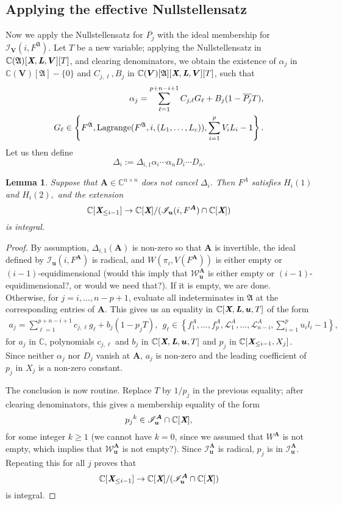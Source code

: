 \documentclass[a4paper]{article}
\def\A{\mathfrak{A}}
\def\Lb{\textit{\textbf{L}}}
\def\Xb{\textit{\textbf{X}}}
\def\mA{{\bm A}}
\def\ub{{\bm u}}
\def\pjb{\overline{P_{j}}}
\def\D{\Delta}
\DeclareMathOperator{\lag}{Lagrange}
\def\C{\mathbb{C}}
\def\WiA{W(\pi_i,V(F^{\mA}))}
\def\lagFfA{{\bm\lag}(F^{\A},i,(L_1,\hdots,L_c))}
\def\Il{\mathscr{I}_{\ub}}
\def\IilA{\mathscr{I}_{\ub}(i,F^{\mA})}
\def\IilfAV{\mathscr{I}_{\bm V}(i,F^{\A})}
\def\Wl{\mathscr{W}_{\ub}}
\def\udl{\sum_{i=1}^pu_il_i}
\def\Vdl{\sum_{i=1}^pV_iL_i}
\newtheorem{lemma}[theorem]{Lemma}
\begin{document}
\subsection{Applying the effective Nullstellensatz}
Now we apply the Nullstellensatz for $\pjb$ with the ideal membership for $\IilfAV.$ Let $T$ be a new variable; applying the
Nullstellensatz in $\C(\A)[\Xb,\Lb,\bm V][T]$, and clearing
denominators, we obtain the existence of $\alpha_j$ in
$\C(\bm V)[\A]-\{0\}$ and $ C_{j,\ell},B_j$ in
$\C(\bm V)[\A][\Xb,\Lb,\bm V][T]$, such that
\begin{align*}
\alpha_j = \sum_{\ell=1}^{p+n-i+1} C_{j,\ell} G_\ell + B_j (1-\pjb T),\\  G_\ell \in 
\left\{ 
F^\A,\lagFfA, \Vdl-1
\right\}.
\end{align*}
Let us then define 
$$\D_{i}:=\D_{i,1} \alpha_i \cdots \alpha_n D_i \cdots D_n.$$

\begin{lemma}\label{lem:6.4}
Suppose that $\mA \in \C^{n\times n}$ does not cancel $\D_{i}$. Then $F^A$ satisfies $H_i(1)$ and $H_i(2),$ and the extension
\[
 \C[\Xb_{\leq i-1}]\rightarrow \C[\Xb]/(\IilA \cap \C[\Xb])
\]
is integral.
\end{lemma}

\begin{proof}
By assumption, $\D_{i,1}(\mA)$ is non-zero so that $\mA$ is
invertible, the
ideal defined by $\IilA$ is radical, and 
$\WiA$ is either empty or $(i-1)$-equidimensional (would this imply that $\Wl^{\mA}$ is either empty or $(i-1)$-equidimensional?, or would we need that?). If
it is empty, we are done. Otherwise, for $j=i,\dots,n-p+1$, evaluate all indeterminates in $\A$ at the
corresponding entries of $\mA$. This gives us
an equality in $\C[\Xb,\Lb,\ub,T]$ of the form
\begin{align*}
a_j = \sum_{\ell=1}^{p+n-i+1} c_{j,\ell} g_\ell + b_j (1-p_j T),\ \  g_\ell \in 
\left\{ 
f_1^A,\hdots,f_p^A,\mathscr{L}_1^A,\dots,\mathscr{L}_{n-i}^A, \udl-1
\right\},
\end{align*}
for $a_j$ in $\C$, polynomials $c_{j,\ell}$ and $b_j$ in
$\C[\Xb,\Lb,\ub,T]$ and $p_j$ in
$\C[\Xb_{\leq i-1},X_j]$. Since neither $\alpha_j$ nor $D_j$
vanish at $\mA$, $a_j$ is non-zero and the leading coefficient of
$p_j$ in $X_j$ is a non-zero constant.

The conclusion is now routine. Replace $T$ by $1/p_j$ in the
previous equality; after clearing denominators, this gives a
membership equality of the form 
\[
p_j{}^k \in \Il^{\mA} \cap \C[\Xb],
\]
for some integer $k \ge 1$ (we cannot have $k=0$, since we assumed that $W^{\mA}$ is not empty, which implies that $\Wl^{\mA}$ is not empty?). Since $\Il^{\mA}$ is radical,
$p_j$ is in $\Il^{\mA}$. Repeating this for all $j$ proves that 
\[
\C[\Xb_{\leq i-1}]\rightarrow\C[\Xb]/(\Il^{\mA} \cap \C[\Xb])
\]
is integral.
\end{proof}
\end{document}
